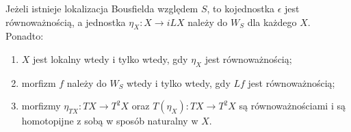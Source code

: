 \begin{stwierdzenie}\label{cat:prop:infty-bousfield-unit}
Jeżeli istnieje lokalizacja Bousfielda względem $S$, to kojednostka $\epsilon$ jest równoważnością, a jednostka $\eta_X:X\to iLX$ należy do $W_S$ dla każdego $X$. Ponadto:
\begin{enumerate}
 \item $X$ jest lokalny wtedy i tylko wtedy, gdy $\eta_X$ jest równoważnością;
 \item morfizm $f$ należy do $W_S$ wtedy i tylko wtedy, gdy $Lf$ jest równoważnością;
 \item morfizmy $\eta_{TX}:TX\to T^2X$ oraz $T(\eta_X):TX\to T^2X$ są równoważnościami i są homotopijne z sobą w sposób naturalny w $X$.
\end{enumerate}
\end{stwierdzenie}
